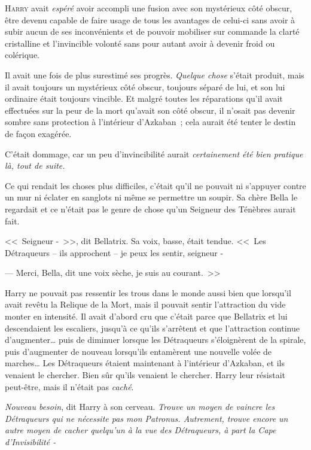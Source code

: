 
\lettrine{H}{arry} avait \emph{espéré} avoir accompli une fusion avec son mystérieux côté obscur, être devenu capable de faire usage de tous les avantages de celui-ci sans avoir à subir aucun de ses inconvénients et de pouvoir mobiliser sur commande la clarté cristalline et l'invincible volonté sans pour autant avoir à devenir froid ou colérique.

Il avait une fois de plus surestimé ses progrès. \emph{Quelque chose} s'était produit, mais il avait toujours un mystérieux côté obscur, toujours séparé de lui, et son lui ordinaire était toujours vincible. Et malgré toutes les réparations qu'il avait effectuées sur la peur de la mort qu'avait son côté obscur, il n'osait pas devenir sombre sans protection à l'intérieur d'Azkaban~; cela aurait été tenter le destin de façon exagérée.

C'était dommage, car un peu d'invincibilité aurait \emph{certainement été bien pratique là, tout de suite.}

Ce qui rendait les choses plus difficiles, c'était qu'il ne pouvait ni s'appuyer contre un mur ni éclater en sanglots ni même se permettre un soupir. Sa chère Bella le regardait et ce n'était pas le genre de chose qu'un Seigneur des Ténèbres aurait fait.

<<~Seigneur -~>>, dit Bellatrix. Sa voix, basse, était tendue. <<~Les Détraqueurs -- ils approchent -- je peux les sentir, seigneur -

--- Merci, Bella, dit une voix sèche, je suis au courant.~>>

Harry ne pouvait pas ressentir les trous dans le monde aussi bien que lorsqu'il avait revêtu la Relique de la Mort, mais il pouvait sentir l'attraction du vide monter en intensité. Il avait d'abord cru que c'était parce que Bellatrix et lui descendaient les escaliers, jusqu'à ce qu'ils s'arrêtent et que l'attraction continue d'augmenter… puis de diminuer lorsque les Détraqueurs s'éloignèrent de la spirale, puis d'augmenter de nouveau lorsqu'ils entamèrent une nouvelle volée de marches… Les Détraqueurs étaient maintenant à l'intérieur d'Azkaban, et ils venaient le chercher. Bien sûr qu'ils venaient le chercher. Harry leur résistait peut-être, mais il n'était pas \emph{caché}.

\emph{Nouveau besoin}, dit Harry à son cerveau. \emph{Trouve un moyen de vaincre les Détraqueurs qui ne nécessite pas mon Patronus. Autrement, trouve encore un autre moyen de cacher quelqu'un à la vue des Détraqueurs, à part la Cape d'Invisibilité -}

